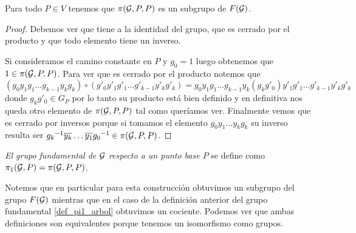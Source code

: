 \documentclass[tesis.tex]{subfiles}
\begin{document}
\begin{prop}
	Para todo $P \in V$ tenemos que $\pi({\cal G},P,P)$ es un subgrupo de $F({\cal G})$.
\end{prop}
\begin{proof}
	Debemos ver que tiene a la identidad del grupo, que es cerrado por el producto y que todo elemento tiene un inverso.

	Si consideramos el camino constante en $P$ y $g_0 = 1$ luego obtenemos que $1 \in \pi({\cal G}, P , P)$.
	Para ver que es cerrado por el producto notemos que 
	\begin{equation*}
		(g_0y_1g_1 \dots g_{k-1}y_kg_k ) \circ ( g'_0y'_1g'_1 \dots g'_{k-1}y'_kg'_k) =  g_0y_1g_1 \dots g_{k-1}y_k(g_kg'_0)y'_1g'_1 \dots g'_{k-1}y'_kg'_k
	\end{equation*}
	donde $g_kg'_0 \in G_P$ por lo tanto su producto está bien definido y en definitiva nos queda otro elemento de $\pi({\cal G}, P, P)$ tal como queríamos ver.
	Finalmente vemos que es cerrado por inversos porque si tomamos el elemento $g_0y_1\dots y_{k} g_k$ su inverso resulta ser ${g_k}^{-1} \overline{y_k} \dots \overline{y_1}{g_0}^{-1} \in \pi({\cal G},P,P)$.
\end{proof}

\begin{deff}
	\emph{El grupo fundamental de ${\cal G}$ respecto a un punto base $P$} se define como $\pi_1({\cal G}, P) = \pi({\cal G},P,P)$.
\end{deff}

Notemos que en particular para esta construcción obtuvimos un subgrupo del grupo $F(\cal G)$ mientras que en el caso de la definición anterior del grupo fundamental \ref{def_pi1_arbol} obtuvimos un cociente.
Podemos ver que ambas definiciones son equivalentes porque tenemos un isomorfismo como grupos.
\end{document}
